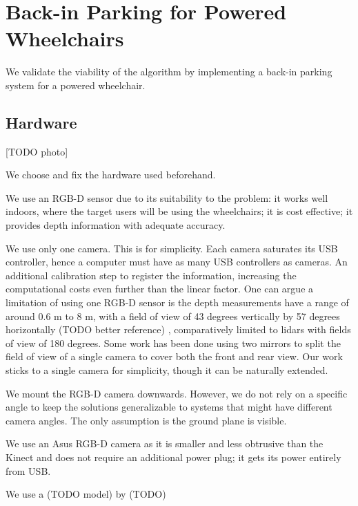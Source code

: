 \chapter{Back-in Parking for Powered Wheelchairs}
\label{ch:wheelchair}

We validate the viability of the algorithm by implementing a back-in parking
system for a powered wheelchair.

\section{Hardware}

[TODO photo]

We choose and fix the hardware used beforehand.

We use an RGB-D sensor due to its suitability to the problem:
it works well indoors, where the target users will be using the wheelchairs; it
is cost effective; it provides depth information with adequate accuracy.

We use only one camera. This is for simplicity. Each camera saturates its USB
controller, hence a computer must have as many USB controllers as cameras.
An additional calibration step to register the information, increasing the
computational costs even further than the linear factor. 
One can argue a limitation of using one RGB-D sensor is the depth measurements
have a range of around 0.6 m to 8 m, with a field of view of 43 degrees
vertically by 57 degrees horizontally (TODO better reference) \cite{endres2014catadioptric},
comparatively limited to lidars with fields of view of 180 degrees. Some work
\cite{endres2014catadioptric} has been done using two mirrors to split the field
of view of a single camera to cover both the front and rear view. Our work
sticks to a single camera for simplicity, though it can be naturally extended.

We mount the RGB-D camera downwards. However, we do not rely on a specific angle
to keep the solutions generalizable to systems that might have different camera
angles. The only assumption is the ground plane is visible.

We use an Asus RGB-D camera as it is smaller and less obtrusive than the Kinect
and does not require an additional power plug; it gets its power entirely from
USB.


We use a (TODO model) by (TODO) 

